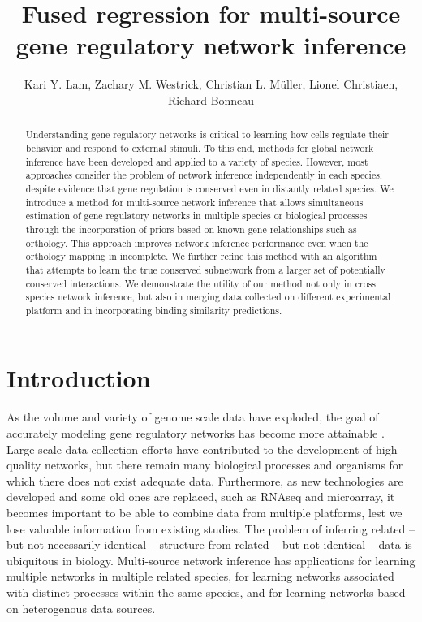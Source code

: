 \documentclass[11pt]{article}
\begin{document}
\title{Fused regression for multi-source gene regulatory network inference}
\author{Kari Y. Lam, Zachary M. Westrick, Christian L. M\"{u}ller, Lionel Christiaen, Richard Bonneau}
\maketitle

\begin{abstract}
Understanding gene regulatory networks is critical to learning how cells regulate their behavior and respond to external stimuli. To this end, methods for global network inference have been developed and applied to a variety of species. However, most approaches consider the problem of network inference independently in each species, despite evidence that gene regulation is conserved even in distantly related species. We introduce a method for multi-source network inference that allows simultaneous estimation of gene regulatory networks in multiple species or biological processes through the incorporation of priors based on known gene relationships such as orthology. This approach improves network inference performance even when the orthology mapping in incomplete. We further refine this method with an algorithm that attempts to learn the true conserved subnetwork from a larger set of potentially conserved interactions. We demonstrate the utility of our method not only in cross species network inference, but also in merging data collected on different experimental platform and in incorporating binding similarity predictions.
\end{abstract}

\section{Introduction}
As the volume and variety of genome scale data have exploded, the goal of accurately modeling gene regulatory networks has become more attainable \cite{bonneau_predictive_2007, ciofani_validated_2012, carro_transcriptional_2010}. Large-scale data collection efforts have contributed to the development of high quality networks, but there remain many biological processes and organisms for which there does not exist adequate data. Furthermore, as new technologies are developed and some old ones are replaced, such as RNAseq and microarray, it becomes important to be able to combine data from multiple platforms, lest we lose valuable information from existing studies. The problem of inferring related -- but not necessarily identical -- structure from related -- but not identical -- data is ubiquitous in biology. Multi-source network inference has applications for learning multiple networks in multiple related species, for learning networks associated with distinct processes within the same species, and for learning networks based on heterogenous data sources.
\end{document}
